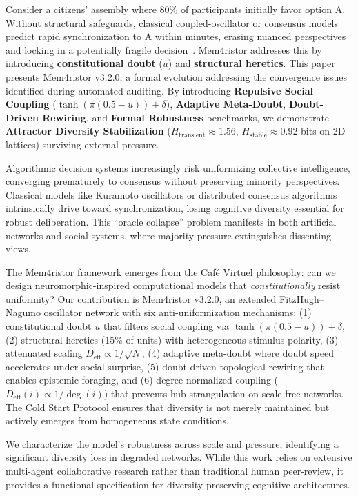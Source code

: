 \documentclass[11pt]{article}
\begin{document}
Consider a citizens' assembly where 80\% of participants initially favor option A. Without structural safeguards, classical coupled-oscillator or consensus models predict rapid synchronization to A within minutes, erasing nuanced perspectives and locking in a potentially fragile decision~\cite{olfati2007,strogatz2000}. %
Mem4ristor addresses this by introducing \textbf{constitutional doubt} ($u$) and \textbf{structural heretics}. This paper presents Mem4ristor v3.2.0, a formal evolution addressing the convergence issues identified during automated auditing. By introducing \textbf{Repulsive Social Coupling} ($\tanh(\pi(0.5-u)) + \delta$), \textbf{Adaptive Meta-Doubt}, \textbf{Doubt-Driven Rewiring}, and \textbf{Formal Robustness} benchmarks, we demonstrate \textbf{Attractor Diversity Stabilization} ($H_{\text{transient}} \approx 1.56$, $H_{\text{stable}} \approx 0.92$ bits on 2D lattices) surviving external pressure.

Algorithmic decision systems increasingly risk uniformizing collective intelligence, converging prematurely to consensus without preserving minority perspectives. Classical models like Kuramoto oscillators or distributed consensus algorithms intrinsically drive toward synchronization, losing cognitive diversity essential for robust deliberation. This ``oracle collapse'' problem manifests in both artificial networks and social systems, where majority pressure extinguishes dissenting views.

The Mem4ristor framework emerges from the Caf\'e Virtuel philosophy: can we design neuromorphic-inspired computational models that \emph{constitutionally} resist uniformity? Our contribution is Mem4ristor v3.2.0, an extended FitzHugh--Nagumo oscillator network with six anti-uniformization mechanisms: (1) constitutional doubt $u$ that filters social coupling via $\tanh(\pi(0.5-u)) + \delta$, (2) structural heretics (15\% of units) with heterogeneous stimulus polarity, (3) attenuated scaling $D_{\text{eff}} \propto 1/\sqrt{N}$, (4) adaptive meta-doubt where doubt speed accelerates under social surprise, (5) doubt-driven topological rewiring that enables epistemic foraging, and (6) degree-normalized coupling ($D_{\text{eff}}(i) \propto 1/\deg(i)$) that prevents hub strangulation on scale-free networks. The Cold Start Protocol ensures that diversity is not merely maintained but actively emerges from homogeneous state conditions.

We characterize the model's robustness across scale and pressure, identifying a significant diversity loss in degraded networks. While this work relies on extensive multi-agent collaborative research rather than traditional human peer-review, it provides a functional specification for diversity-preserving cognitive architectures.
\end{document}
